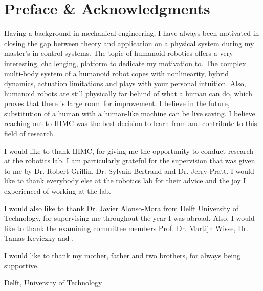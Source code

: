 %
\chapter{Preface \& Acknowledgments}%
Having a background in mechanical engineering, I have always been motivated in closing the gap between theory and application on a physical system during my master's in control systems. The topic of humanoid robotics offers a very interesting, challenging, platform to dedicate my motivation to. The complex multi-body system of a humanoid robot copes with nonlinearity, hybrid dynamics, actuation limitations and plays with your personal intuition. Also, humanoid robots are still physically far behind of what a human can do, which proves that there is large room for improvement. I believe in the future, substitution of a human with a human-like machine can be live saving. I believe reaching out to \ac{IHMC} was the best decision to learn from and contribute to this field of research.

I would like to thank \ac{IHMC}, for giving me the opportunity to conduct research at the robotics lab. I am particularly grateful for the supervision that was given to me by Dr. Robert Griffin, Dr. Sylvain Bertrand and Dr. Jerry Pratt. I would like to thank everybody else at the robotics lab for their advice and the joy I experienced of working at the lab. 

I would also like to thank Dr. Javier Alonso-Mora from Delft University of Technology, for supervising me throughout the year I was abroad. Also, I would like to thank the examining committee members Prof. Dr. Martijn Wisse, Dr. Tamas Keviczky and .

I would like to thank my mother, father and two brothers, for always being supportive.

\vspace*{15mm}

Delft, University of Technology \hfill \mscname \\
\mscdate